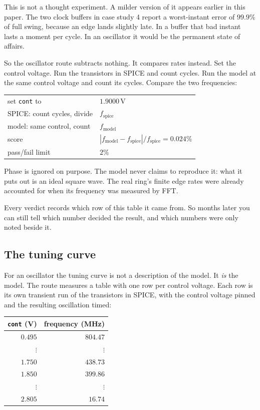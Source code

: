 \documentclass[11pt,a4paper]{article}
\newcommand{\unit}[1]{\,\textrm{#1}}
\begin{document}
This is not a thought experiment. A milder version of it appears
earlier in this paper. The two clock buffers in case study 4 report a
worst-instant error of $99.9\%$ of full swing, because an edge lands
slightly late. In a buffer that bad instant lasts a moment per cycle.
In an oscillator it would be the permanent state of affairs.

So the oscillator route subtracts nothing. It compares rates instead.
Set the control voltage. Run the transistors in SPICE and count
cycles. Run the model at the same control voltage and count its
cycles. Compare the two frequencies:

\begin{center}
\begin{tabular}{@{}ll@{}}
\toprule
set \texttt{cont} to        & $1.9000\unit{V}$ \\
SPICE: count cycles, divide & $f_\mathrm{spice}$ \\
model: same control, count  & $f_\mathrm{model}$ \\
score                       & $|f_\mathrm{model}-f_\mathrm{spice}| / f_\mathrm{spice} = 0.024\%$ \\
pass/fail limit             & $2\%$ \\
\bottomrule
\end{tabular}
\end{center}

\noindent Phase is ignored on purpose. The model never claims to
reproduce it: what it puts out is an ideal square wave. The real
ring's finite edge rates were already accounted for when its frequency
was measured by FFT.


\noindent Every verdict records which row of this table it came from.
So months later you can still tell which number decided the result,
and which numbers were only noted beside it.

\subsection{The tuning curve}

\noindent For an oscillator the tuning curve is not a description of
the model. It \emph{is} the model. The route measures a table with one
row per control voltage. Each row is its own transient run of the
transistors in SPICE, with the control voltage pinned and the
resulting oscillation timed:

\begin{center}
\begin{tabular}{@{}rr@{}}
\toprule
\texttt{cont} (V) & frequency (MHz) \\
\midrule
$0.495$ & $804.47$ \\
$\vdots$ & $\vdots$ \\
$1.750$ & $438.73$ \\
$1.850$ & $399.86$ \\
$\vdots$ & $\vdots$ \\
$2.805$ & $16.74$ \\
\bottomrule
\end{tabular}
\end{center}
\end{document}
